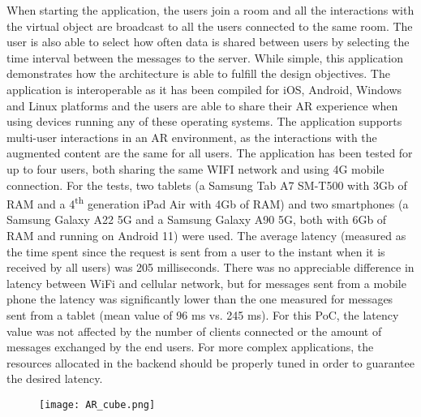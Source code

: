 When starting the application, the users join a room and all the interactions with the virtual object are broadcast to all the users connected to the same room. The user is also able to select how often data is shared between users by selecting the time interval between the messages to the server. While simple, this application demonstrates how the architecture is able to fulfill the design objectives. The application is interoperable as it has been compiled for iOS, Android, Windows and Linux platforms and the users are able to share their AR experience when using devices running any of these operating systems. The application supports multi-user interactions in an AR environment, as the interactions with the augmented content are the same for all users. The application has been tested for up to four users, both sharing the same WIFI network and using 4G mobile connection. For the tests, two tablets (a Samsung Tab A7 SM-T500 with 3Gb of RAM and a 4\textsuperscript{th} generation iPad Air with 4Gb of RAM) and two smartphones (a Samsung Galaxy A22 5G and a Samsung Galaxy A90 5G, both with 6Gb of RAM and running on Android 11) were used. The average latency (measured as the time spent since the request is sent from a user to the instant when it is received by all users) was 205 milliseconds. There was no appreciable difference in latency between WiFi and cellular network, but for messages sent from a mobile phone the latency was significantly lower than the one measured for messages sent from a tablet (mean value of 96 ms vs. 245 ms). For this PoC, the latency value was not affected by the number of clients connected or the amount of messages exchanged by the end users. For more complex applications, the resources allocated in the backend should be properly tuned in order to guarantee the desired latency.

\begin{figure}[htbp]
    \begin{center}
    \texttt{[image: AR\_cube.png]}
    \caption{\fontsize{10pt}{11pt}}
    \label{fig:arcube}
    \end{center}
\end{figure}


